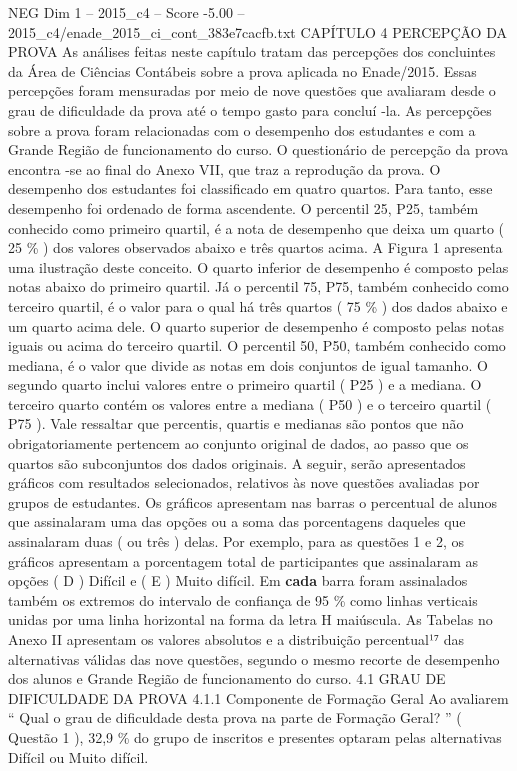 \begin{textsample}{NEG Dim 1 – 2015\_c4 – Score -5.00 – 2015\_c4/enade\_2015\_ci\_cont\_383e7cacfb.txt}  \label{ex:f1_neg_101}
CAPÍTULO 4 PERCEPÇÃO DA PROVA As análises feitas neste capítulo tratam das percepções dos concluintes da Área de Ciências Contábeis sobre a prova aplicada no Enade/2015.
Essas percepções foram mensuradas por meio de nove questões que avaliaram desde o grau de dificuldade da prova até o tempo gasto para concluí -la.
As percepções sobre a prova foram relacionadas com o desempenho dos estudantes e com a Grande Região de funcionamento do curso.
O questionário de percepção da prova encontra -se ao final do Anexo VII, que traz a reprodução da prova.
O desempenho dos estudantes foi classificado em quatro quartos.
Para tanto, esse desempenho foi ordenado de forma ascendente.
O percentil 25, P25, também conhecido como primeiro quartil, é a nota de desempenho que deixa um quarto ( 25 \% ) dos valores observados abaixo e três quartos acima.
A Figura 1 apresenta uma ilustração deste conceito.
O quarto inferior de desempenho é composto pelas notas abaixo do primeiro quartil.
Já o percentil 75, P75, também conhecido como terceiro quartil, é o valor para o qual há três quartos ( 75 \% ) dos dados abaixo e um quarto acima dele.
O quarto superior de desempenho é composto pelas notas iguais ou acima do terceiro quartil.
O percentil 50, P50, também conhecido como mediana, é o valor que divide as notas em dois conjuntos de igual tamanho.
O segundo quarto inclui valores entre o primeiro quartil ( P25 ) e a mediana.
O terceiro quarto contém os valores entre a mediana ( P50 ) e o terceiro quartil ( P75 ).
Vale ressaltar que percentis, quartis e medianas são pontos que não obrigatoriamente pertencem ao conjunto original de dados, ao passo que os quartos são subconjuntos dos dados originais.
A seguir, serão apresentados gráficos com resultados selecionados, relativos às nove questões avaliadas por grupos de estudantes.
Os gráficos apresentam nas barras o percentual de alunos que assinalaram uma das opções ou a soma das porcentagens daqueles que assinalaram duas ( ou três ) delas.
Por exemplo, para as questões 1 e 2, os gráficos apresentam a porcentagem total de participantes que assinalaram as opções ( D ) Difícil e ( E ) Muito difícil.
Em \textbf{cada} barra foram assinalados também os extremos do intervalo de confiança de 95 \% como linhas verticais unidas por uma linha horizontal na forma da letra H maiúscula.
As Tabelas no Anexo II apresentam os valores absolutos e a distribuição percentual¹⁷ das alternativas válidas das nove questões, segundo o mesmo recorte de desempenho dos alunos e Grande Região de funcionamento do curso. 4.1 GRAU DE DIFICULDADE DA PROVA 4.1.1 Componente de Formação Geral Ao avaliarem “ Qual o grau de dificuldade desta prova na parte de Formação Geral? ” ( Questão 1 ), 32,9 \% do grupo de inscritos e presentes optaram pelas alternativas Difícil ou Muito difícil.

\end{textsample}
